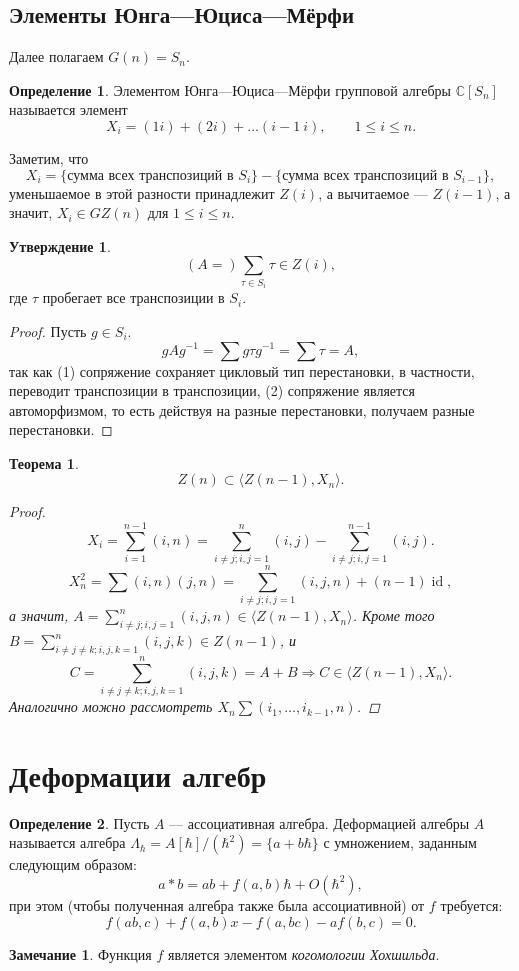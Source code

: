 \documentclass[12pt]{article}%
\renewcommand{\leq}{\leqslant}
\newcommand{\h}{\ensuremath{\hbar}}
\renewcommand{\C}{\ensuremath{\mathbb C}}
\renewcommand{\leq}{\leqslant}
\DeclareMathOperator{\Id}{id}
\newtheorem{Thm}{Теорема}[section]
\theoremstyle{remark}
\theoremstyle{definition}
\newtheorem{Prop}{Утверждение}
\newtheorem*{Remark}{Замечание}
\newtheorem{Def}{Определение}[section]
\begin{document}
\subsection{Элементы Юнга—Юциса—Мёрфи}
Далее полагаем $G(n) = S_n$. 

\begin{Def}
Элементом Юнга—Юциса—Мёрфи групповой алгебры $\C[S_n]$ называется элемент
\[
    X_i = (1i) + (2i) + \ldots (i-1\:i), \qquad 1 \leq i \leq n.
\]
\end{Def}

Заметим, что
\[
    X_i = \{ \text{сумма всех транспозиций в $S_i$} \} -
     \{ \text{сумма всех транспозиций в $S_{i-1}$} \},
\]
уменьшаемое в этой разности принадлежит $Z(i)$, а вычитаемое — $Z(i-1)$, а
значит, $X_i \in GZ(n)$ для $1 \leq i \leq n$.
\begin{Prop}
\[
    (A =) \sum_{\tau \in S_i} \tau \in Z(i),
\]
где $\tau$ пробегает все транспозиции в $S_i$. 
\end{Prop}
\begin{proof}
Пусть $g \in S_i$.
\[
    gAg^{-1} = \sum g\tau g^{-1} = \sum \tau = A,
\]
так как (1) сопряжение сохраняет цикловый тип перестановки, в частности,
переводит транспозиции в транспозиции, (2) сопряжение является автоморфизмом, то
есть действуя на разные перестановки, получаем разные перестановки. 
\end{proof}
\begin{Thm}
\[
    Z(n) \subset \langle Z(n-1), X_n \rangle.
\]
\begin{proof}
\[
    X_i = \sum_{i=1}^{n-1}(i,n) =  \sum_{i\neq j; i,j=1}^{n} (i,j) - 
    \sum_{i\neq j; i,j=1}^{n-1} (i,j).
\]
\[
    X_n^2 = \sum(i,n)(j,n) = \sum_{i\neq j; i,j=1}^{n}(i,j,n)  + (n-1)\Id,
\]
а значит, $A = \sum_{i\neq j; i,j=1}^{n}(i,j,n) \in \langle Z(n-1), X_n
\rangle$. Кроме того $B = \sum_{i\neq j \neq k; i,j,k=1}^{n}(i,j,k) \in Z(n-1)$,
и
\[
    C = \sum_{i\neq j \neq k; i,j,k=1}^n (i,j,k) = A + B \Longrightarrow C \in
    \langle Z(n-1), X_n \rangle.
\]
Аналогично можно рассмотреть $X_n\sum(i_1, \ldots, i_{k-1},n)$.

\end{proof}
\end{Thm}

\section{Деформации алгебр}

\begin{Def}
Пусть $A$ — ассоциативная алгебра. Деформацией алгебры $A$ называется алгебра
$\Lambda_\h = A[\h] / (\h^2) = \{ a + b\h \}$ с умножением, заданным следующим
образом:
\[
    a * b = ab + f(a,b)\h + O(\h^2),
\]
при этом (чтобы полученная алгебра также была ассоциативной) от $f$ требуется:
\[
    f(ab, c) + f(a,b)x - f(a, bc) - af(b,c) = 0.
\]
\end{Def}
\begin{Remark}
Функция $f$ является элементом \emph{когомологии Хохшильда}.
\end{Remark}
\end{document}
